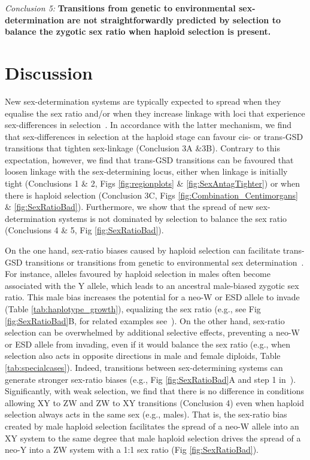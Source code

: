 \documentclass[10pt,letterpaper]{article}
\begin{document}
\noindent\textit{Conclusion 5:}
\textbf{
Transitions from genetic to environmental sex-determination are not straightforwardly predicted by selection to balance the zygotic sex ratio when haploid selection is present. 
}

\section*{Discussion}

New sex-determination systems are typically expected to spread when they equalise the sex ratio and/or when they increase linkage with loci that experience sex-differences in selection~\cite{Blaser2012, vanDoorn2014re}.
In accordance with the latter mechanism, we find that sex-differences in selection at the haploid stage can favour cis- or trans-GSD transitions that tighten sex-linkage (Conclusion 3A \&3B). 
Contrary to this expectation, however, we find that trans-GSD transitions can be favoured that loosen linkage with the sex-determining locus, either when linkage is initially tight (Conclusions 1 \& 2, Figs \ref{fig:regionplots} \& \ref{fig:SexAntagTighter}) or when there is haploid selection (Conclusion 3C, Figs \ref{fig:Combination_Centimorgans} \& \ref{fig:SexRatioBad}). 
Furthermore, we show that the spread of new sex-determination systems is not dominated by selection to balance the sex ratio (Conclusions 4 \& 5, Fig \ref{fig:SexRatioBad}). 

On the one hand, sex-ratio biases caused by haploid selection can facilitate trans-GSD transitions or transitions from genetic to environmental sex determination~\cite{Kozielska:2010vm}. 
For instance, alleles favoured by haploid selection in males often become associated with the Y allele, which leads to an ancestral male-biased zygotic sex ratio.
This male bias increases the potential for a neo-W or ESD allele to invade (Table \ref{tab:haplotype_growth}), equalizing the sex ratio (e.g., see Fig \ref{fig:SexRatioBad}B, for related examples see~\cite{Kozielska:2010vm}).
On the other hand, sex-ratio selection can be overwhelmed by additional selective effects, preventing a neo-W or ESD allele from invading, even if it would balance the sex ratio (e.g., when selection also acts in opposite directions in male and female diploids, Table \ref{tab:specialcases}).
Indeed, transitions between sex-determining systems can generate stronger sex-ratio biases (e.g., Fig \ref{fig:SexRatioBad}A and step 1 in~\cite{Ubeda:2015fx}).
Significantly, with weak selection, we find that there is no difference in conditions allowing XY to ZW and ZW to XY transitions (Conclusion 4) 
even when haploid selection always acts in the same sex (e.g., males).  
That is, the sex-ratio bias created by male haploid selection facilitates the spread of a neo-W allele into an XY system to the same degree that male haploid selection drives the spread of a neo-Y into a ZW system with a 1:1 sex ratio (Fig \ref{fig:SexRatioBad}).
\end{document}
